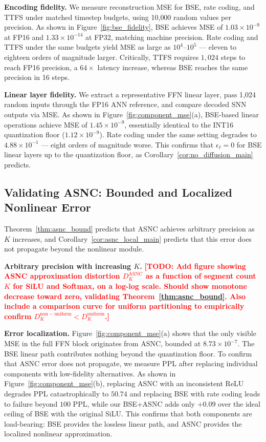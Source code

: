 \documentclass{article}
\theoremstyle{plain}
\theoremstyle{definition}
\theoremstyle{remark}
\begin{document}
\noindent\textbf{Encoding fidelity.}
We measure reconstruction MSE for BSE, rate coding, and TTFS under matched timestep
budgets, using 10{,}000 random values per precision. As shown in
Figure~\ref{fig:bse_fidelity}, BSE achieves MSE of $1.03 \times 10^{-9}$ at FP16
and $1.33 \times 10^{-14}$ at FP32, matching machine precision. Rate coding and TTFS
under the same budgets yield MSE as large as $10^4$--$10^5$ — eleven to eighteen
orders of magnitude larger. Critically, TTFS requires $1{,}024$ steps to reach FP16
precision, a $64\times$ latency increase, whereas BSE reaches the same precision in
16 steps.

\noindent\textbf{Linear layer fidelity.}
We extract a representative FFN linear layer, pass 1{,}024 random inputs through the
FP16 ANN reference, and compare decoded SNN outputs via MSE. As shown in
Figure~\ref{fig:component_mse}(a), BSE-based linear operations achieve MSE of $1.45
\times 10^{-9}$, essentially identical to the INT16 quantization floor ($1.12 \times
10^{-9}$). Rate coding under the same setting degrades to $4.88 \times 10^{-1}$ —
eight orders of magnitude worse. This confirms that $\epsilon_\ell = 0$ for BSE
linear layers up to the quantization floor, as Corollary~\ref{cor:no_diffusion_main}
predicts.


\subsection{Validating ASNC: Bounded and Localized Nonlinear Error}
\label{subsec:exp_asnc}

Theorem~\ref{thm:asnc_bound} predicts that ASNC achieves arbitrary precision as $K$
increases, and Corollary~\ref{cor:asnc_local_main} predicts that this error does not
propagate beyond the nonlinear module.

\noindent\textbf{Arbitrary precision with increasing $K$.}
\textcolor{red}{\textbf{[TODO: Add figure showing ASNC approximation distortion
$D_K^{\mathrm{ASNC}}$ as a function of segment count $K$ for SiLU and Softmax, on a
log-log scale. Should show monotone decrease toward zero, validating
Theorem~\ref{thm:asnc_bound}. Also include a comparison curve for uniform
partitioning to empirically confirm $D_K^{\mathrm{non-uniform}} <
D_K^{\mathrm{uniform}}$.]}}

\noindent\textbf{Error localization.}
Figure~\ref{fig:component_mse}(a) shows that the only visible MSE in the full FFN
block originates from ASNC, bounded at $8.73 \times 10^{-7}$. The BSE linear path
contributes nothing beyond the quantization floor. To confirm that ASNC error does
not propagate, we measure PPL after replacing individual components with low-fidelity
alternatives. As shown in Figure~\ref{fig:component_mse}(b), replacing ASNC with an
inconsistent ReLU degrades PPL catastrophically to $50.74$ and replacing BSE with
rate coding leads to failure beyond $100$ PPL, while our BSE+ASNC adds only $+0.09$
over the ideal ceiling of BSE with the original SiLU. This confirms that both
components are load-bearing: BSE provides the lossless linear path, and ASNC provides
the localized nonlinear approximation.
\end{document}
